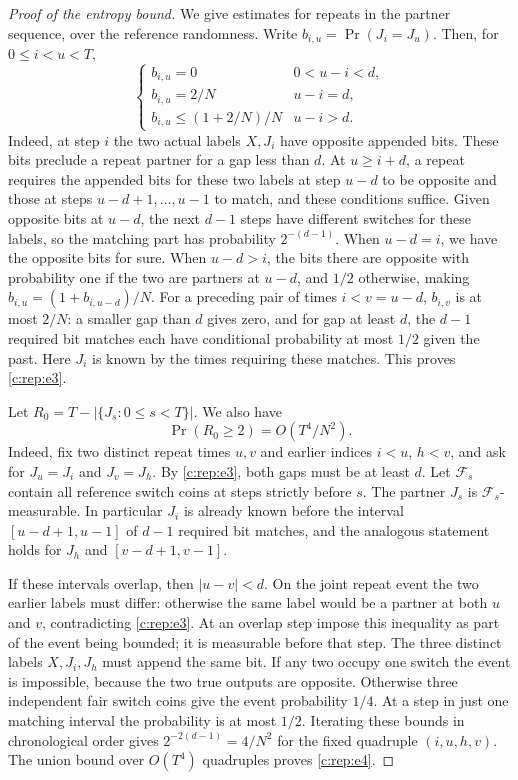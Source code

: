 \begin{proof}[Proof of the entropy bound]
\label{c:rep:repeat-proof}
We give estimates for repeats in the partner sequence, over the reference randomness. Write
\(b_{i,u}=\Pr(J_i=J_u)\). Then, for \(0\le i<u<T\),
\begin{equation}
\begin{cases}
 b_{i,u}=0 & 0<u-i<d,\\
 b_{i,u}=2/N & u-i=d,\\
 b_{i,u}\le (1+2/N)/N & u-i>d.
\end{cases}                                                        \label{c:rep:e3}
\end{equation}
Indeed, at step \(i\) the two actual labels \(X,J_i\) have opposite appended bits. These bits
preclude a repeat partner for a gap less than \(d\). At \(u\ge i+d\), a repeat requires the
appended bits for these two labels at step \(u-d\) to be opposite and those at steps
\(u-d+1,\ldots,u-1\) to match, and these conditions suffice. Given opposite bits at \(u-d\),
the next \(d-1\) steps have different switches for these labels, so the matching part has
probability \(2^{-(d-1)}\). When \(u-d=i\), we have the opposite bits for sure. When \(u-d>i\),
the bits there are opposite with probability one if the two are partners at \(u-d\), and
\(1/2\) otherwise, making \(b_{i,u}=(1+b_{i,u-d})/N\). For a preceding pair of times
\(i<v=u-d\), \(b_{i,v}\) is at most \(2/N\): a smaller gap than \(d\) gives zero, and for gap
at least \(d\), the \(d-1\) required bit matches each have conditional probability at most
\(1/2\) given the past. Here \(J_i\) is known by the times requiring these matches. This proves
\eqref{c:rep:e3}.

\label{c:rep:two-repeats}
Let \(R_0=T-|\{J_s:0\le s<T\}|\). We also have
\begin{equation}
\Pr(R_0\ge 2)=O(T^4/N^2).                                          \label{c:rep:e4}
\end{equation}
Indeed, fix two distinct repeat times $u,v$ and earlier indices
$i<u$, $h<v$, and ask for $J_u=J_i$ and $J_v=J_h$. By
\eqref{c:rep:e3}, both gaps must be at least $d$. Let $\mathcal F_s$
contain all reference switch coins at steps strictly before $s$.
The partner $J_s$ is $\mathcal F_s$-measurable. In particular $J_i$
is already known before the interval
$[u-d+1,u-1]$ of $d-1$ required bit matches, and the analogous
statement holds for $J_h$ and $[v-d+1,v-1]$.

If these intervals overlap, then $|u-v|<d$. On the joint repeat
event the two earlier labels must differ: otherwise the same label
would be a partner at both $u$ and $v$, contradicting
\eqref{c:rep:e3}. At an overlap step impose this inequality as part
of the event being bounded; it is measurable before that step.
The three distinct labels $X,J_i,J_h$ must append the same bit.
If any two occupy one switch the event is impossible, because the
two true outputs are opposite. Otherwise three independent fair
switch coins give the event probability $1/4$. At a step in just one
matching interval the probability is at most $1/2$. Iterating these
bounds in chronological order gives $2^{-2(d-1)}=4/N^2$ for the fixed
quadruple $(i,u,h,v)$. The union bound over $O(T^4)$ quadruples proves
\eqref{c:rep:e4}.


\end{proof}
